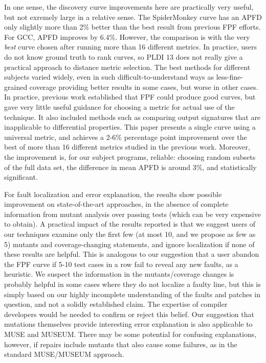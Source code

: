 In one sense, the discovery curve improvements here are practically very useful, but not exremely large in a relative sense.  The SpiderMonkey curve has an APFD only slightly more than 2\% better than the best result from previous FPF efforts.  For GCC, APFD improves by 6.4\%.  However, the comparison is with the very \emph{best} curve chosen after running more than 16 different metrics.  In practice, users do not know ground truth to rank curves, so PLDI 13 does not really give a practical approach to distance metric selection.  The best methods for different subjects varied widely, even in such difficult-to-understand ways as less-fine-grained coverage providing better results in some cases, but worse in other cases.   In practice, previous work established that FPF could produce good curves, but gave very little useful guidance for choosing a metric for actual use of the technique.  It also included methods such as comparing output signatures that are inapplicable to differential properties.  This paper presents a single curve using a universal metric, and achieves a 2-6\% percentage point improvement over the best of more than 16 different metrics studied in the previous work.  Moreover, the improvement is, for our subject programs, reliable:  choosing random subsets of the full data set, the difference in mean APFD is around 3\%, and statistically significant.

For fault localization and error explanation, the results show possible improvement on state-of-the-art approaches, in the absence of complete information from mutant analysis over passing tests (which can be very expensive to obtain).  A practical impact of the results reported is that we suggest users of our techniques examine only the first few (at most 10, and we propose as few as 5) mutants and coverage-changing statements, and ignore localization if none of these results are helpful.  This is analogous to our suggestion that a user abandon the FPF curve if 5-10 test cases in a row fail to reveal any new faults, as a heuristic.  We suspect the information in the mutants/coverage changes is probably helpful in some cases where they do not localize a faulty line, but this is simply based on our highly incomplete understanding of the faults and patches in question, and not a solidly established claim.  The expertise of compiler developers would be needed to confirm or reject this belief.  Our suggestion that mutations themselves provide interesting error explanation is also applicable to MUSE and MUSEUM.  There may be some potential for confusing explanations, however, if repairs include mutants that also cause some failures, as in the standard MUSE/MUSEUM approach.  

